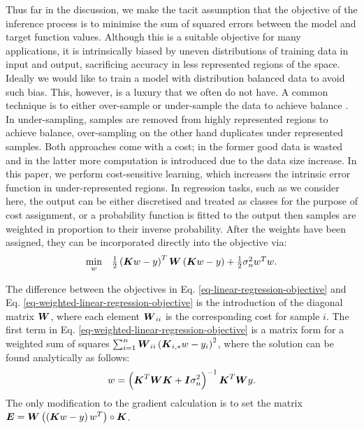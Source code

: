 \documentclass[useAMS,usenatbib,fleqn]{mn2e}
\begin{document}
Thus far in the discussion, we make the tacit assumption that the objective of the inference process is to minimise the sum of squared errors between the model and target function values. Although this is a suitable objective for many applications, it is intrinsically biased by uneven distributions of training data in input and output, sacrificing accuracy in less represented regions of the space. Ideally we would like to train a model with distribution balanced data to avoid such bias. This, however, is a luxury that we often do not have. A common technique is to either over-sample or under-sample the data to achieve balance \citep{weiss2007}. In under-sampling, samples are removed from highly represented regions to achieve balance, over-sampling on the other hand duplicates under represented samples. Both approaches come with a cost; in the former good data is wasted and in the latter more computation is introduced due to the data size increase. In this paper, we perform cost-sensitive learning, which increases the intrinsic error function in under-represented regions. In regression tasks, such as we consider here, the output can be either discretised and treated as classes for the purpose of cost assignment, or a probability function is fitted to the output then samples are weighted in proportion to their inverse probability. After the weights have been assigned, they can be incorporated directly into the objective via:
\begin{equation}
\label{eq-weighted-linear-regression-objective}
\begin{array}{lcl}
\underset{w}{\text{min}} &\frac{1}{2}\left ( \bmath{K}w-y \right )^{T} \bmath{W}\left( \bmath{K}w-y \right )+\frac{1}{2}\sigma_{n}^{2}w^{T}w.
\end{array}
\end{equation}

The difference between the objectives in Eq. \eqref{eq-linear-regression-objective} and Eq. \eqref{eq-weighted-linear-regression-objective} is the introduction of the diagonal matrix $\bmath{W}$, where each element $\bmath{W}_{ii}$ is the corresponding cost for sample $i$. The first term in Eq. \eqref{eq-weighted-linear-regression-objective} is a matrix form for a weighted sum of squares $\sum_{i=1}^{n}\bmath{W}_{ii}\left(\bmath{K}_{i,*}w-y_{i}\right)^{2}$, where the solution can be found analytically as follows:
\begin{equation}
\label{eq-weighted-linear-regression-objective-rectangular}
w = \left(\bmath{K}^{T}\bmath{WK}+\bmath{I}\sigma_{n}^{2} \right)^{-1}\bmath{K}^{T}\bmath{W}y.
\end{equation}
The only modification to the gradient calculation is to set the matrix $\bmath{E}=\bmath{W}\left(\left(\bmath{K}w-y\right)w^{T}\right)\circ\bmath{K}$.
\end{document}

